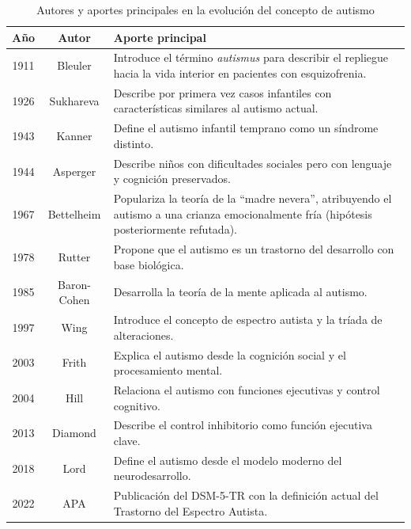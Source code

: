 \documentclass{book}
\begin{document}
\begin{table}[H]
\centering
\begin{tabular}{|c|c|p{7.5cm}|}
\hline

Año & Autor & Aporte principal \\

\hline

1911 & Bleuler & Introduce el término \textit{autismus} para describir el repliegue hacia la vida interior en pacientes con esquizofrenia. \\

1926 & Sukhareva & Describe por primera vez casos infantiles con características similares al autismo actual. \\

1943 & Kanner & Define el autismo infantil temprano como un síndrome distinto. \\

1944 & Asperger & Describe niños con dificultades sociales pero con lenguaje y cognición preservados. \\

1967 & Bettelheim & Populariza la teoría de la “madre nevera”, atribuyendo el autismo a una crianza emocionalmente fría (hipótesis posteriormente refutada). \\

1978 & Rutter & Propone que el autismo es un trastorno del desarrollo con base biológica. \\

1985 & Baron-Cohen & Desarrolla la teoría de la mente aplicada al autismo. \\

1997 & Wing & Introduce el concepto de espectro autista y la tríada de alteraciones. \\

2003 & Frith & Explica el autismo desde la cognición social y el procesamiento mental. \\

2004 & Hill & Relaciona el autismo con funciones ejecutivas y control cognitivo. \\

2013 & Diamond & Describe el control inhibitorio como función ejecutiva clave. \\

2018 & Lord & Define el autismo desde el modelo moderno del neurodesarrollo. \\

2022 & APA & Publicación del DSM-5-TR con la definición actual del Trastorno del Espectro Autista. \\

\hline

\end{tabular}

\caption{Autores y aportes principales en la evolución del concepto de autismo}
\end{table}
\end{document}
